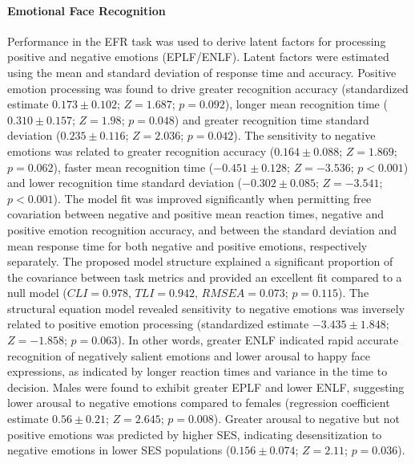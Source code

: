 \documentclass[utf8]{frontiersSCNS} %
\begin{document}
\paragraph{Emotional Face Recognition} Performance in the EFR task was used to derive latent factors for processing positive and negative emotions (EPLF/ENLF). Latent factors were estimated using the mean and standard deviation of response time and accuracy. Positive emotion processing was found to drive greater recognition accuracy (standardized estimate $0.173\pm0.102$; $Z=1.687$; $p=0.092$), longer mean recognition time ($0.310\pm0.157$; $Z=1.98$; $p=0.048$) and greater recognition time standard deviation ($0.235\pm0.116$; $Z=2.036$; $p=0.042$). The sensitivity to negative emotions was related to greater recognition accuracy ($0.164\pm0.088$; $Z=1.869$; $p=0.062$), faster mean recognition time ($-0.451\pm0.128$; $Z=-3.536$; $p<0.001$) and lower recognition time standard deviation ($-0.302\pm0.085$; $Z=-3.541$; $p<0.001$). The model fit was improved significantly when permitting free covariation between negative and positive mean reaction times, negative and positive emotion recognition accuracy, and between the standard deviation and mean response time for both negative and positive emotions, respectively separately. The proposed model structure explained a significant proportion of the covariance between task metrics and provided an excellent fit compared to a null model ($CLI = 0.978$, $TLI = 0.942$, $RMSEA = 0.073$; $p = 0.115$). The structural equation model revealed sensitivity to negative emotions was inversely related to positive emotion processing (standardized estimate $-3.435\pm1.848$; $Z=-1.858$; $p = 0.063$). In other words, greater ENLF indicated rapid accurate recognition of negatively salient emotions and lower arousal to happy face expressions, as indicated by longer reaction times and variance in the time to decision. Males were found to exhibit greater EPLF and lower ENLF, suggesting lower arousal to negative emotions compared to females (regression coefficient estimate $0.56\pm0.21$; $Z=2.645$; $p = 0.008$). Greater arousal to negative but not positive emotions was predicted by higher SES, indicating desensitization to negative emotions in lower SES populations ($0.156\pm0.074$; $Z=2.11$; $p = 0.036$). 
\end{document}
